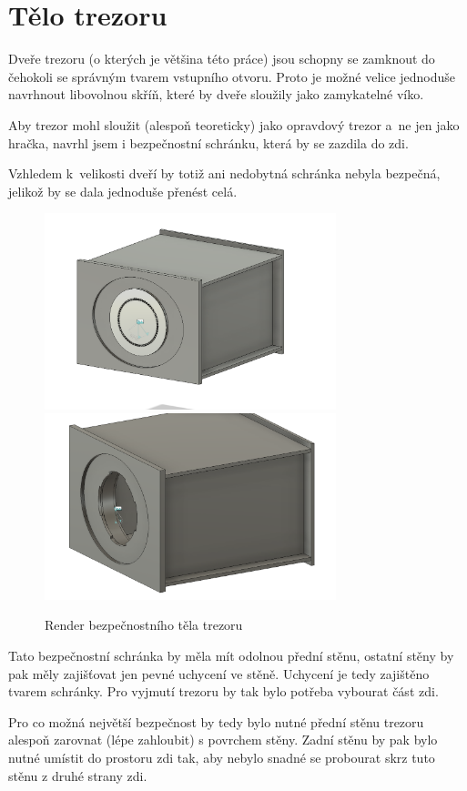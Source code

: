 \section{Tělo trezoru}
Dveře trezoru (o kterých je většina této práce) jsou schopny se zamknout do čehokoli se správným tvarem vstupního otvoru. 
Proto je možné velice jednoduše navrhnout libovolnou skříň, které by dveře sloužily jako zamykatelné víko. 

Aby trezor mohl sloužit (alespoň teoreticky) jako opravdový trezor a~ne jen jako hračka, navrhl jsem i bezpečnostní schránku, která by se zazdila do zdi. 

Vzhledem k~velikosti dveří by totiž ani nedobytná schránka nebyla bezpečná, jelikož by se dala jednoduše přenést celá.

\begin{figure}[htbp]
    \centering
    \includegraphics[width=240pt]{kapitoly/obrazky/E4/bedna/bedna.png}
    \includegraphics[width=240pt]{kapitoly/obrazky/E4/bedna/jen-bedna.png}
    \caption{Render bezpečnostního těla trezoru}
    \label{fig:E4-bedna}
\end{figure}

Tato bezpečnostní schránka by měla mít odolnou přední stěnu, ostatní stěny by pak měly zajišťovat jen pevné uchycení ve stěně.
Uchycení je tedy zajištěno tvarem schránky. Pro vyjmutí trezoru by tak bylo potřeba vybourat část zdi.
\enlargethispage{5mm}

Pro co možná největší bezpečnost by tedy bylo nutné přední stěnu trezoru alespoň zarovnat (lépe zahloubit) s povrchem stěny.
Zadní stěnu by pak bylo nutné umístit do prostoru zdi tak, aby nebylo snadné se probourat skrz tuto stěnu z druhé strany zdi.